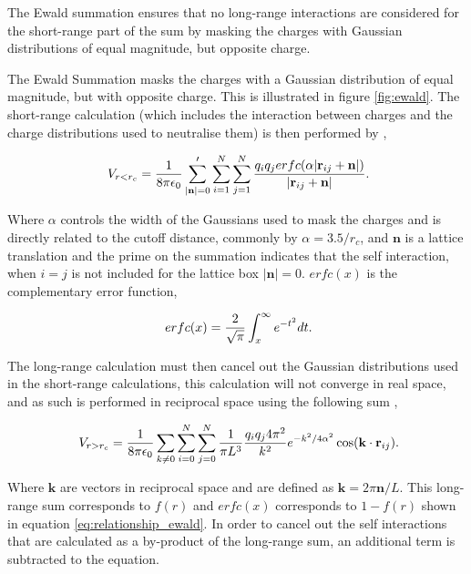The Ewald summation ensures that no long-range interactions are considered for the short-range part of the sum by masking the charges with Gaussian distributions of equal magnitude, but opposite charge.  

The Ewald Summation masks the charges with a Gaussian distribution of equal magnitude, but with opposite charge.  This is illustrated in figure \ref{fig:ewald}.  The short-range calculation (which includes the interaction between charges and the charge distributions used to neutralise them) is then performed by \cite{ewald_help},

\begin{equation}
 \ V_{r<r_c}=\frac{1}{8\pi \epsilon_0}\sum_{|\textbf{n}|=0}^\prime \sum_{i=1}^{N} \sum_{j=1}^{N} \frac{q_iq_jerfc(\alpha|\textbf{r}_{ij}+\textbf{n}|)}{|\textbf{r}_{ij}+\textbf{n}|} \\.
\end{equation}

Where $\alpha$ controls the width of the Gaussians used to mask the charges and is directly related to the cutoff distance, commonly by $\alpha=3.5/r_c$\cite{Stat_mech}, and $\textbf{n}$ is a lattice translation and the prime on the summation indicates that the self interaction, when $i=j$ is not included for the lattice box $|\textbf{n}|=0$.  $erfc(x)$ is the complementary error function,

\begin{equation}
 \ erfc(x)=\frac{2}{\sqrt{\pi}}\int_{x}^{\infty}e^{-t^2}dt \\.
\end{equation}

The long-range calculation must then cancel out the Gaussian distributions used in the short-range calculations, this calculation will not converge in real space\cite{ewald_help}, and as such is performed in reciprocal space using the following sum \cite{leach_molecular_modelling},

\begin{equation}
 \ V_{r>r_c}=\frac{1}{8\pi\epsilon_0} \sum_{k\neq0}\sum_{i=0}^{N}\sum_{j=0}^{N}\frac{1}{\pi L^3}\frac{q_iq_j4\pi^2}{k^2}e^{-k^2/4\alpha^2}\cos(\textbf{k}\cdot \textbf{r}_{ij}) \\.
\end{equation}

Where $\textbf{k}$ are vectors in reciprocal space and are defined as $\textbf{k}=2\pi\textbf{n}/L$.  This long-range sum corresponds to $f(r)$ and $erfc(x)$ corresponds to $1-f(r)$ shown in equation \ref{eq:relationship_ewald}.  In order to cancel out the self interactions that are calculated as a by-product of the long-range sum, an additional term is subtracted to the equation.

